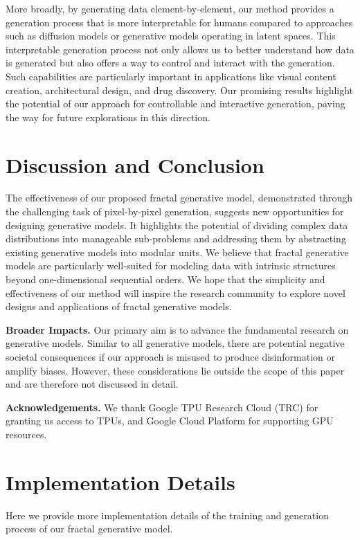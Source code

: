 \documentclass{article}
\begin{document}
More broadly, by generating data element-by-element, our method provides a generation process that is more interpretable for humans compared to approaches such as diffusion models or generative models operating in latent spaces. This interpretable generation process not only allows us to better understand how data is generated but also offers a way to control and interact with the generation. Such capabilities are particularly important in applications like visual content creation, architectural design, and drug discovery. Our promising results highlight the potential of our approach for controllable and interactive generation, paving the way for future explorations in this direction.

 \section{Discussion and Conclusion}
\label{sec:discussion}

The effectiveness of our proposed fractal generative model, demonstrated through the challenging task of pixel-by-pixel generation, suggests new opportunities for designing generative models. It highlights the potential of dividing complex data distributions into manageable sub-problems and addressing them by abstracting existing generative models into modular units. We believe that fractal generative models are particularly well-suited for modeling data with intrinsic structures beyond one-dimensional sequential orders. We hope that the simplicity and effectiveness of our method will inspire the research community to explore novel designs and applications of fractal generative models. 
\clearpage

\noindent\textbf{Broader Impacts.}  Our primary aim is to advance the fundamental research on generative models.
Similar to all generative models, there are potential negative societal consequences if our approach is misused to produce disinformation or amplify biases. However, these considerations lie outside the scope of this paper and are therefore not discussed in detail.

\noindent\textbf{Acknowledgements.} We thank Google TPU Research
Cloud (TRC) for granting us access to TPUs, and Google Cloud Platform for supporting GPU resources. 
{\small


}

\clearpage

\appendix
\section{Implementation Details}
\label{sec:implementation}
Here we provide more implementation details of the training and generation process of our fractal generative model.
\end{document}
